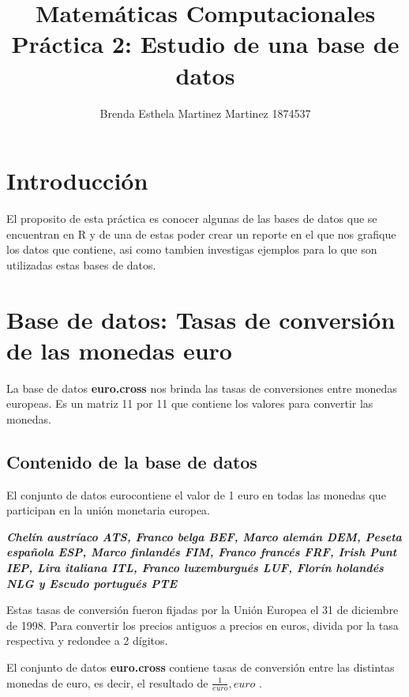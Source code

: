 \documentclass[12pt,a4paper]{article}
\title{Matemáticas Computacionales \\ Práctica 2: Estudio de una base de datos}
\author{Brenda Esthela Martinez Martinez  1874537}
\begin{document}
\maketitle
\section{Introducci\'{o}n}\label{sec:intro}

El proposito de esta práctica es conocer algunas de las bases de datos que se encuentran en R y de una de estas poder crear un reporte en el que nos grafique los datos que contiene, asi como tambien investigas ejemplos para lo que son utilizadas estas bases de datos.

\section{Base de datos: Tasas de conversión de las monedas euro}\label{sec:DATABASE}
La base de datos \textbf{euro.cross} \cite{euro} nos brinda las tasas de conversiones entre monedas europeas. Es un matriz 11 por 11 que contiene los valores para convertir las monedas. 
\subsection{Contenido de la base de datos}
El conjunto de datos eurocontiene el valor de 1 euro en todas las monedas que participan en la unión monetaria europea.\cite{1streport}

		\textit{\textbf{Chelín austríaco ATS,
		Franco belga BEF,
		Marco alemán DEM,
		Peseta española ESP,
		Marco finlandés FIM,
		Franco francés FRF,
		Irish Punt IEP,
		Lira italiana ITL,
		Franco luxemburgués LUF,
		Florín holandés NLG y
		Escudo portugués PTE}
	}
		
Estas tasas de conversión fueron fijadas por la Unión Europea el 31 de diciembre de 1998. Para convertir los precios antiguos a precios en euros, divida por la tasa respectiva y redondee a 2 dígitos.

El conjunto de datos \textbf{euro.cross} contiene tasas de conversión entre las distintas monedas de euro, es decir, el resultado de  $ \frac{1}{euro}, euro $ . 
\end{document}
